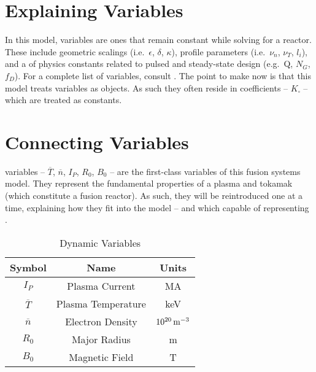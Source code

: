 \section{Explaining  Variables} 

In this model,  variables are ones that remain constant while solving for a reactor. These include geometric scalings (i.e.\ $\epsilon$, $\delta$, $\kappa$), profile parameters (i.e.\ $\nu_n$, $\nu_T$, $l_i$), and a  of physics constants related to pulsed and steady-state design (e.g.\ Q, $N_G$, $f_D$). For a complete list of  variables, consult . The point to make now is that this model treats  variables as  objects. As such they often reside in  coefficients -- $K_\square$ -- which are treated as constants.

\section{Connecting  Variables}

 variables -- $\overline T$, $\overline n$, $I_P$, $R_0$, $B_0$ -- are the first-class variables of this fusion systems model. They represent the fundamental properties of a plasma and tokamak (which constitute a fusion reactor). As such, they will be reintroduced one at a time, explaining how they fit into the model -- and which  capable of representing .

\begin{table}[h!]
\centering	
\caption{Dynamic Variables}
\begin{tabular}{ c|c|c } 

\textbf{Symbol} & \textbf{Name} & \textbf{Units} \\
\hline
$I_P$ & Plasma Current & MA \\ 
$\overline{T}$ & Plasma Temperature & keV \\ 
$\overline{n}$ & Electron Density & $10^{20} \, \textnormal{m}^{-3}$ \\ 
$R_0$ &  Major Radius & m \\ 
$B_0$ &  Magnetic Field & T
\end{tabular}
\label{table:dynamic}
\end{table}


